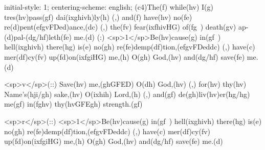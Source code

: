 initial-style: 1;
centering-scheme: english;
(c4)The(f) while(hv) I(g) tres(hv)pass(gf) dai(ixghivh)ly(h) (,) and(f) have(hv) no(fe) re(d)pent(efgvFDed)ance,(dc) (,) the(fv) fear(ixfhivHG) of(fg~) death(gv) ap-(d)pal-(dg/hf)leth(fe) me.(d) (:) <sp>1</sp>Be(hv)cause(g) in(gf~) hell(ixghivh) there(hg) is(e) no(gh) re(fe)demp(df)tion,(efgvFDeddc) (,) have(c) mer(df)cy(fv) up(fd)on(ixfgiHG) me,(h) O(gh) God,(hv) and(dg/hf) save(fe) me.(d)

<sp>v</sp>(::) Save(hv) me,(ghGFED) O(dh) God,(hv) (,) for(hv) thy(hv) Name's(hji/gh) sake,(hv) O(ixhih) Lord,(h) (,) and(gf) de(gh)liv(hv)er(hg/hg) me(gf) in(fghv) thy(hvGFEgh) strength.(gf)

<sp>r</sp>(::) <sp>1</sp>Be(hv)cause(g) in(gf~) hell(ixghivh) there(hg) is(e) no(gh) re(fe)demp(df)tion,(efgvFDeddc) (,) have(c) mer(df)cy(fv) up(fd)on(ixfgiHG) me,(h) O(gh) God,(hv) and(dg/hf) save(fe) me.(d)